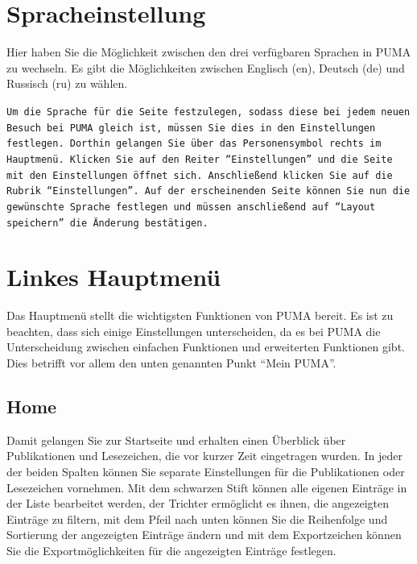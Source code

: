 \section{Spracheinstellung}
Hier haben Sie die Möglichkeit zwischen den drei verfügbaren Sprachen in PUMA zu wechseln. Es gibt die Möglichkeiten zwischen Englisch (en), Deutsch (de) und Russisch (ru) zu wählen.
\begin{mdframed}[style=mdfexample1,frametitle={\texttt{\textbf{TIPP}}},backgroundcolor=gray!40] \texttt{Um die Sprache für die Seite festzulegen, sodass diese bei jedem neuen Besuch bei PUMA gleich ist, müssen Sie dies in den Einstellungen festlegen. Dorthin gelangen Sie über das Personensymbol rechts im Hauptmenü. Klicken Sie auf den Reiter \enquote{Einstellungen} und die Seite mit den Einstellungen öffnet sich. Anschließend klicken Sie auf die Rubrik \enquote{Einstellungen}. Auf der erscheinenden Seite können Sie nun die gewünschte Sprache festlegen und müssen anschließend auf \enquote{Layout speichern} die Änderung bestätigen.}
\end{mdframed}
  

\section{Linkes Hauptmenü} 
Das Hauptmenü stellt die wichtigsten Funktionen von PUMA bereit. Es ist zu beachten, dass sich einige Einstellungen unterscheiden, da es bei PUMA die Unterscheidung zwischen einfachen Funktionen und erweiterten Funktionen gibt. Dies betrifft vor allem den unten genannten Punkt \enquote{Mein PUMA}. 
\subsection{Home}
Damit gelangen Sie zur Startseite und erhalten einen Überblick über Publikationen und Lesezeichen, die vor kurzer Zeit eingetragen wurden. In jeder der beiden Spalten können Sie separate Einstellungen für die Publikationen oder Lesezeichen vornehmen. Mit dem schwarzen Stift können alle eigenen Einträge in der Liste bearbeitet werden, der Trichter ermöglicht es ihnen, die angezeigten Einträge zu filtern, mit dem Pfeil nach unten können Sie die Reihenfolge und Sortierung der angezeigten Einträge ändern und mit dem Exportzeichen können Sie die Exportmöglichkeiten für die angezeigten Einträge festlegen.
